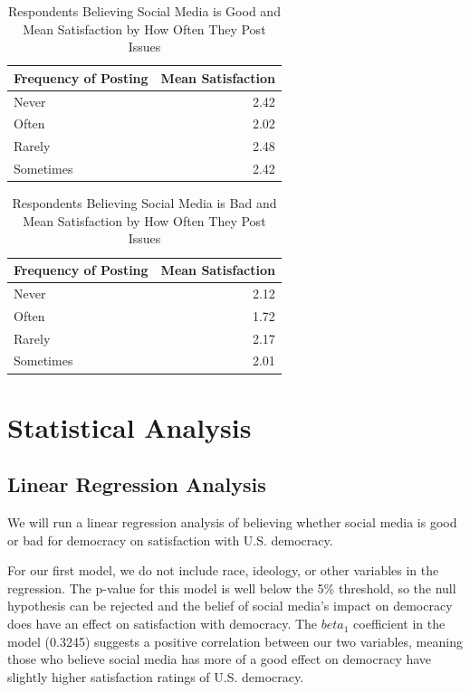 \documentclass[
]{article}
\begin{document}
\begin{table}[ht]
\centering
\caption{Respondents Believing Social Media is Good
             and Mean Satisfaction by How Often They Post Issues} 
\begin{tabular}{lr}
  \hline
Frequency of Posting & Mean Satisfaction \\ 
  \hline
Never & 2.42 \\ 
  Often & 2.02 \\ 
  Rarely & 2.48 \\ 
  Sometimes & 2.42 \\ 
   \hline
\end{tabular}
\end{table}
\begin{table}[ht]
\centering
\caption{Respondents Believing Social Media is Bad
             and Mean Satisfaction by How Often They Post Issues} 
\begin{tabular}{lr}
  \hline
Frequency of Posting & Mean Satisfaction \\ 
  \hline
Never & 2.12 \\ 
  Often & 1.72 \\ 
  Rarely & 2.17 \\ 
  Sometimes & 2.01 \\ 
   \hline
\end{tabular}
\end{table}

\hypertarget{statistical-analysis}{%
\section{Statistical Analysis}\label{statistical-analysis}}

\hypertarget{linear-regression-analysis}{%
\subsection{Linear Regression
Analysis}\label{linear-regression-analysis}}

We will run a linear regression analysis of believing whether social
media is good or bad for democracy on satisfaction with U.S. democracy.

For our first model, we do not include race, ideology, or other
variables in the regression. The p-value for this model is well below
the 5\% threshold, so the null hypothesis can be rejected and the belief
of social media's impact on democracy does have an effect on
satisfaction with democracy. The \(beta_1\) coefficient in the model
(0.3245) suggests a positive correlation between our two variables,
meaning those who believe social media has more of a good effect on
democracy have slightly higher satisfaction ratings of U.S. democracy.
\end{document}
